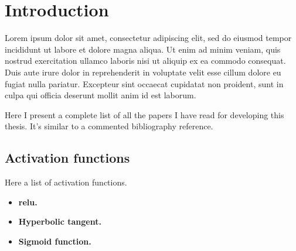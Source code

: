 

\chapter{Introduction}\label{cha:introduction}



\drop Lorem ipsum dolor sit amet, consectetur adipiscing elit, sed do eiusmod
tempor incididunt ut labore et dolore magna aliqua. Ut enim ad minim veniam,
quis nostrud exercitation ullamco laboris nisi ut aliquip ex ea commodo
consequat. Duis aute irure dolor in reprehenderit in voluptate velit esse
cillum dolore eu fugiat nulla pariatur. Excepteur sint occaecat cupidatat non
proident, sunt in culpa qui officia deserunt mollit anim id est laborum.

Here I present a complete list of all the papers I have read for developing this
thesis. It's similar to a commented bibliography reference.


\section{Activation functions}
Here a list of activation functions.


\begin{itemize}
  \item \textbf{\acf*{relu}.}
  \item \textbf{Hyperbolic tangent.}
  \item \textbf{Sigmoid function.}
\end{itemize}

